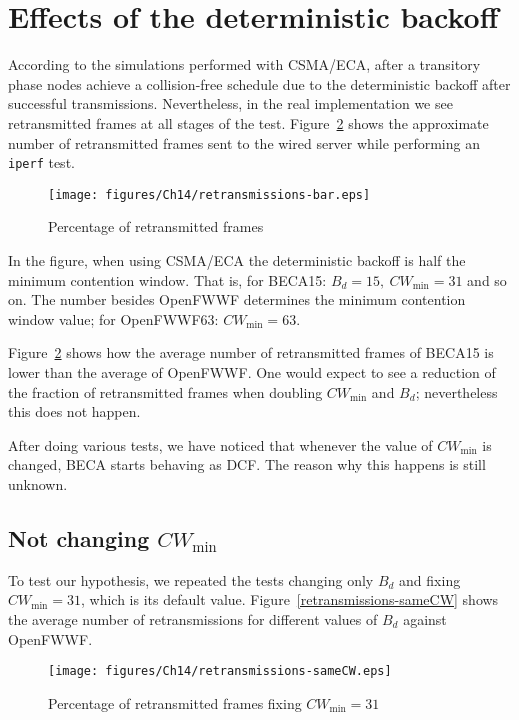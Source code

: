 \documentclass[a4paper]{journal}
\begin{document}
\section{Effects of the deterministic backoff}
According to the simulations performed with CSMA/ECA, after a transitory phase nodes achieve a collision-free schedule due to the deterministic backoff after successful transmissions. Nevertheless, in the real implementation we see retransmitted frames at all stages of the test. Figure~\ref{retransmissions} shows the approximate number of retransmitted frames sent to the wired server while performing an \texttt{iperf} test.

	\begin{figure}[htbp]
	\centering
		\texttt{[image: figures/Ch14/retransmissions-bar.eps]}
		\caption{Percentage of retransmitted frames}
		\label{retransmissions}
	\end{figure}

In the figure, when using CSMA/ECA the deterministic backoff is half the minimum contention window. That is, for BECA15: $B_d=15,~CW_{\min}=31$ and so on. The number besides OpenFWWF determines the minimum contention window value; for OpenFWWF63: $CW_{\min}=63$.

Figure~\ref{retransmissions} shows how the average number of retransmitted frames of BECA15 is lower than the average of OpenFWWF. One would expect to see a reduction of the fraction of retransmitted frames when doubling $CW_{\min}$ and $B_d$; nevertheless this does not happen.

After doing various tests, we have noticed that whenever the value of $CW_{\min}$ is changed, BECA starts behaving as DCF. The reason why this happens is still unknown.

	\subsection{Not changing $CW_{\min}$}
	To test our hypothesis, we repeated the tests changing only $B_d$ and fixing $CW_{\min}=31$, which is its default value. Figure~\ref{retransmissions-sameCW} shows the average number of retransmissions for different values of $B_d$ against OpenFWWF.
	
	\begin{figure}[htbp]
	\centering
		\texttt{[image: figures/Ch14/retransmissions-sameCW.eps]}
		\caption{Percentage of retransmitted frames fixing $CW_{\min}=31$}
		\label{retransmissions}
	\end{figure}
	
\end{document}
